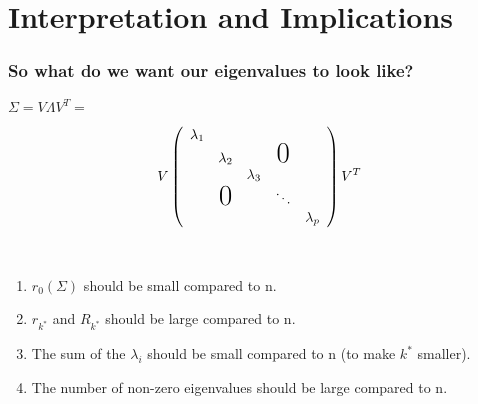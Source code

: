 \documentclass[pdf]{beamer}
\begin{document}
\section{Interpretation and Implications}

\begin{frame}
\fontsize{8pt}{9pt}
\frametitle{So what do we want our eigenvalues to look like?}

$\Sigma = V \Lambda V^{T} =$

\[
    V \left(
    \begin{array}{ccccc}
    \lambda_{1}                                    \\
      & \lambda_{2}   &   & \text{\huge0}\\
      &               & \lambda_{3}                 \\
      & \text{\huge0} &   & \ddots             \\
      &               &   &   & \lambda_{p} 
    \end{array}
    \right) V^{T}
\]  


\\
\begin{enumerate}
\item<3-6> $r_{0}(\Sigma)$ should be small compared to n.
\item<4-6> $r_{k^{*}}$ and $R_{k^{*}}$ should be large compared to n.
\item<5-6> The sum of the $\lambda_{i}$ should be small compared to n (to make $k^{*}$ smaller).
\item<6-6> The number of non-zero eigenvalues should be large compared to n.
\end{enumerate}

\end{frame}
\end{document}
